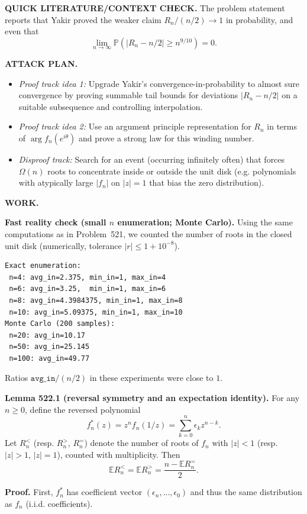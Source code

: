 \bigskip
\noindent\textbf{QUICK LITERATURE/CONTEXT CHECK.}
The problem statement reports that Yakir proved the weaker claim $R_n/(n/2)\to 1$ in probability, and even that
\[\lim_{n\to\infty}\mathbb P(|R_n-n/2|\ge n^{9/10})=0.
\]

\bigskip
\noindent\textbf{ATTACK PLAN.}
\begin{itemize}
\item \emph{Proof track idea 1:} Upgrade Yakir's convergence-in-probability to almost sure convergence by proving summable tail bounds for deviations $|R_n-n/2|$ on a suitable subsequence and controlling interpolation.
\item \emph{Proof track idea 2:} Use an argument principle representation for $R_n$ in terms of $\arg f_n(e^{i\theta})$ and prove a strong law for this winding number.
\item \emph{Disproof track:} Search for an event (occurring infinitely often) that forces $\Omega(n)$ roots to concentrate inside or outside the unit disk (e.g. polynomials with atypically large $|f_n|$ on $|z|=1$ that bias the zero distribution).
\end{itemize}

\bigskip
\noindent\textbf{WORK.}

\medskip
\noindent\textbf{Fast reality check (small $n$ enumeration; Monte Carlo).}
Using the same computations as in Problem~521, we counted the number of roots in the closed unit disk (numerically, tolerance $|r|\le 1+10^{-8}$).
\begin{verbatim}
Exact enumeration:
 n=4: avg_in=2.375, min_in=1, max_in=4
 n=6: avg_in=3.25,  min_in=1, max_in=6
 n=8: avg_in=4.3984375, min_in=1, max_in=8
 n=10: avg_in=5.09375, min_in=1, max_in=10
Monte Carlo (200 samples):
 n=20: avg_in=10.17
 n=50: avg_in=25.145
 n=100: avg_in=49.77
\end{verbatim}
Ratios $\texttt{avg\_in}/(n/2)$ in these experiments were close to $1$.

\medskip
\noindent\textbf{Lemma 522.1 (reversal symmetry and an expectation identity).}
For any $n\ge 0$, define the reversed polynomial
\[f_n^*(z)=z^n f_n(1/z)=\sum_{k=0}^n \epsilon_k z^{n-k}.
\]
Let $R_n^{<}$ (resp. $R_n^{>}$, $R_n^{=}$) denote the number of roots of $f_n$ with $|z|<1$ (resp. $|z|>1$, $|z|=1$), counted with multiplicity. Then
\[\mathbb E R_n^{<} = \mathbb E R_n^{>} = \frac{n-\mathbb E R_n^{=}}{2}.
\]

\noindent\textbf{Proof.}
First, $f_n^*$ has coefficient vector $(\epsilon_n,\dots,\epsilon_0)$ and thus the same distribution as $f_n$ (i.i.d. coefficients).

